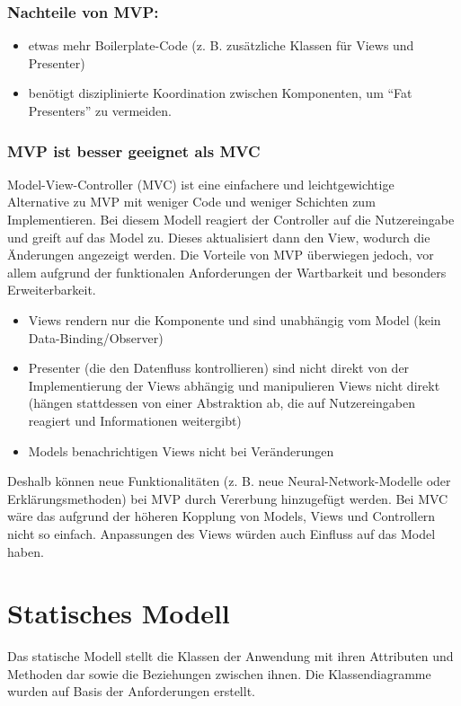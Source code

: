 \subsubsection{Nachteile von MVP:}
\begin{itemize}
    \item etwas mehr Boilerplate-Code (z. B. zusätzliche Klassen für Views und Presenter)
    \item benötigt disziplinierte Koordination zwischen Komponenten, um \enquote{Fat Presenters} zu vermeiden.
\end{itemize}
\subsubsection{MVP ist besser geeignet als MVC}
Model-View-Controller (MVC) ist eine einfachere und leichtgewichtige Alternative zu MVP mit weniger Code und weniger Schichten zum Implementieren.
Bei diesem Modell reagiert der Controller auf die Nutzereingabe und greift auf das Model zu.
Dieses aktualisiert dann den View, wodurch die Änderungen angezeigt werden. \cite{mvc_vs_mvp}
Die Vorteile von MVP überwiegen jedoch, vor allem aufgrund der funktionalen Anforderungen der Wartbarkeit und besonders Erweiterbarkeit.
\begin{itemize}
    \item Views rendern nur die Komponente und sind unabhängig vom Model (kein Data-Binding/Observer)
    \item Presenter (die den Datenfluss kontrollieren) sind nicht direkt von der Implementierung der Views abhängig und manipulieren Views nicht direkt (hängen stattdessen von einer Abstraktion ab, die auf Nutzereingaben reagiert und Informationen weitergibt)
    \item Models benachrichtigen Views nicht bei Veränderungen
\end{itemize}
Deshalb können neue Funktionalitäten (z. B. neue Neural-Network-Modelle oder Erklärungsmethoden) bei MVP durch Vererbung hinzugefügt werden.
Bei MVC wäre das aufgrund der höheren Kopplung von Models, Views und Controllern nicht so einfach.
Anpassungen des Views würden auch Einfluss auf das Model haben.

\section{Statisches Modell}
Das statische Modell stellt die Klassen der Anwendung mit ihren Attributen und Methoden dar sowie die Beziehungen zwischen ihnen.
Die Klassendiagramme wurden auf Basis der Anforderungen erstellt.
